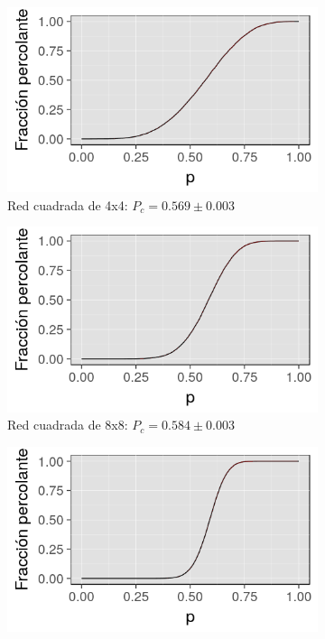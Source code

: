 \documentclass[%
 reprint,
 amsmath,amssymb,
 aps,
spanish]{revtex4-1}
\begin{document}
\begin{figure}[h]
\begin{subfigure}{.25\textwidth}
  \centering
  \includegraphics[width=.9\linewidth]{ej1b/4x4}
  \caption{Red cuadrada de 4x4: $P_c=0.569\pm0.003$}
  \label{fig:1b4x4}
\end{subfigure}%
\begin{subfigure}{.25\textwidth}
  \centering
  \includegraphics[width=.9\linewidth]{ej1b/8x8}
  \caption{Red cuadrada de 8x8: $P_c=0.584\pm0.003$}
  \label{fig:1b8x8}
\end{subfigure}
\begin{subfigure}{.25\textwidth}
  \centering
  \includegraphics[width=.9\linewidth]{ej1b/16x16}

\end{subfigure}
\end{figure}
\end{document}
